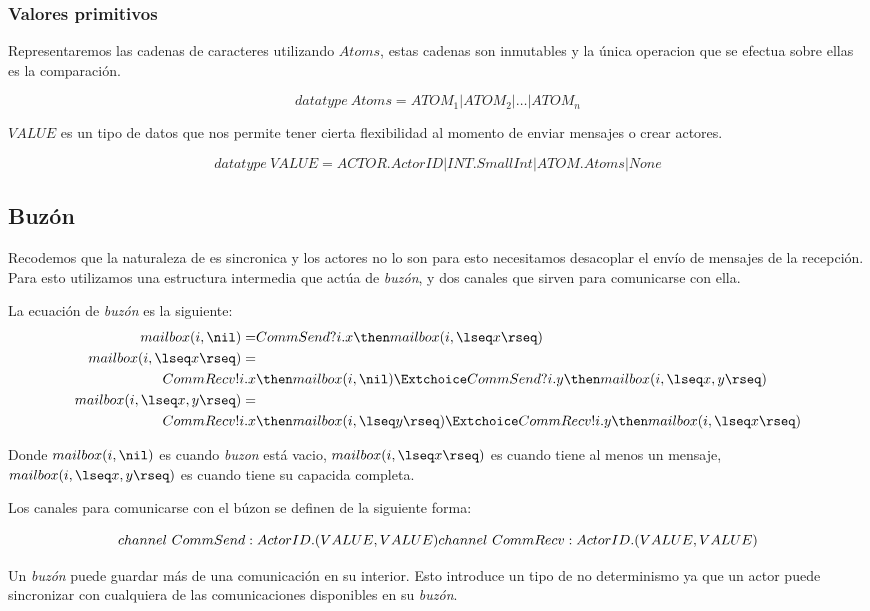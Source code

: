 \subsubsection{Valores primitivos}

Representaremos las cadenas de caracteres utilizando $Atoms$, estas cadenas son inmutables y la única operacion que se efectua sobre ellas es la comparación.

\[
  datatype\ Atoms = ATOM_1 | ATOM_2 | \ldots | ATOM_n
\]

$VALUE$ es un tipo de datos que nos permite tener cierta flexibilidad al momento de enviar mensajes o crear actores.

\[
  datatype\ VALUE = ACTOR.ActorID | INT.SmallInt | ATOM.Atoms | None
\]

\subsection{Buzón} 

Recodemos que la naturaleza de \CSP es sincronica y los actores no lo son para esto necesitamos desacoplar el envío de mensajes de la recepción. Para esto utilizamos una estructura intermedia que actúa de \textit{buzón}, y dos canales que sirven para comunicarse con ella.

La ecuación de \textit{buzón} es la siguiente:
\begin{align*}
mailbox(i, \nil) =& CommSend?i.x \then mailbox(i, \lseq x \rseq) \\
mailbox(i, \lseq x \rseq) =& \\
CommRecv!i.x & \then mailbox(i, \nil) \Extchoice CommSend?i.y \then mailbox(i, \lseq x, y \rseq) \\
mailbox(i, \lseq x, y \rseq) =& \\
CommRecv!i.x & \then mailbox(i, \lseq y \rseq) \Extchoice CommRecv!i.y \then mailbox(i, \lseq x \rseq) 
\end{align*}

Donde $mailbox(i, \nil)$ es cuando \textit{buzon} está vacio, $mailbox(i, \lseq x \rseq)$ es cuando tiene al menos un mensaje, $mailbox(i, \lseq x, y \rseq)$ es cuando tiene su capacida completa.

Los canales para comunicarse con el búzon se definen de la siguiente forma:

\[
channel\ CommSend:ActorID.(VALUE, VALUE)\\
channel\ CommRecv:ActorID.(VALUE, VALUE)
\]

Un \textit{buzón} puede guardar más de una comunicación en su interior. Esto introduce un tipo de no determinismo ya que un actor puede sincronizar con cualquiera de las comunicaciones disponibles en su \textit{buzón}.

